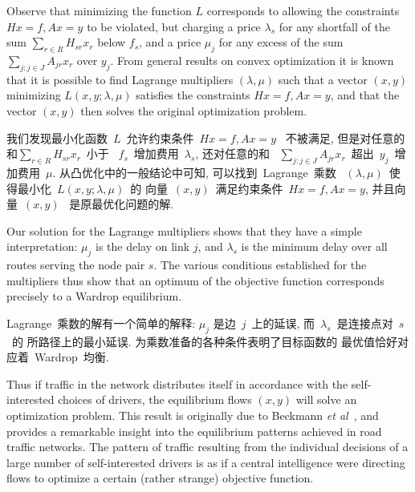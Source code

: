 \documentclass[a4paper,12pt, twocolumn]{article}
\begin{document}
Observe that minimizing the function $L$ corresponds to allowing
the constraints $Hx=f, Ax=y$ to be violated, but charging a
price $\lambda_s$ for any shortfall of the sum $\sum_{r \in R} H_{sr} x_r$
below $f_s$, and a price $\mu_j$ for any excess of the
sum $\sum_{j: j \in J} A_{jr} x_r$ over $y_j$.
From general results on convex optimization it is 
known that it is possible to find Lagrange multipliers $(\lambda, \mu)$
such that a vector $(x,y)$ minimizing $L(x ,y ;\lambda ,\mu)$
satisfies the constraints $Hx=f, Ax=y$,  and that 
the vector $(x,y)$ then solves 
the original optimization problem.

我们发现最小化函数~$L$~允许约束条件~$Hx=f, Ax=y$~
不被满足, 但是对任意的和$\sum_{r \in R} H_{sr} x_r$~小于
~$f_{s}$~增加费用~$\lambda_s$, 还对任意的和
~$\sum_{j: j \in J} A_{jr} x_r$~超出~$y_j$~增加费用~$\mu$. 
从凸优化中的一般结论中可知, 可以找到~Lagrange~乘数
~$(\lambda, \mu)$~使得最小化~$L(x ,y ;\lambda ,\mu)$~的
向量~$(x,y)$~满足约束条件~$Hx=f, Ax=y$, 并且向量~$(x,y)$~
是原最优化问题的解. 

Our solution for the Lagrange multipliers shows that 
they have a simple interpretation: 
$\mu_j$ is the
delay on link $j$, and $\lambda_s$ is the minimum delay over all
routes serving the node pair $s$. The various conditions
established for the multipliers thus show
that an optimum of the objective function
corresponds precisely to a Wardrop equilibrium. 

Lagrange~乘数的解有一个简单的解释: 
$\mu_j$
是边~$j$~上的延误, 而~$\lambda_s$~是连接点对~$s$~的
所路径上的最小延误. 为乘数准备的各种条件表明了目标函数的
最优值恰好对应着~Wardrop~均衡. 


Thus if traffic in the network distributes itself in
accordance with the self-interested choices of drivers,
the equilibrium flows $(x, y)$ will
solve an optimization problem. This result is 
originally due to Beckmann {\it et al}~\cite{BMW},
and provides a remarkable insight into the equilibrium patterns
achieved in road traffic networks.  The pattern of traffic
resulting from the 
individual decisions of a large number of self-interested drivers 
is as if a central intelligence were 
directing flows to optimize a certain (rather strange)
objective function.
\end{document}
